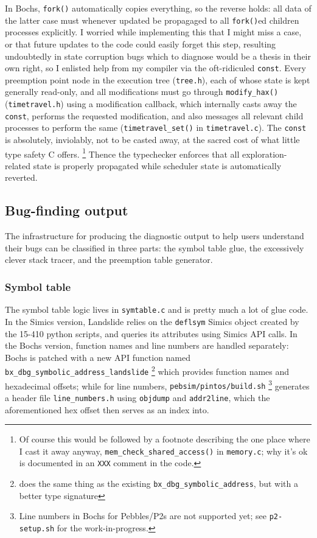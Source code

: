 In Bochs, {\tt fork()} automatically copies everything, so the reverse holds:
all data of the latter case must whenever updated be propagaged to all {\tt fork()}ed children processes explicitly.
I worried while implementing this that I might miss a case, or that future updates to the code could easily forget this step,
resulting undoubtedly in state corruption bugs which to diagnose would be a thesis in their own right,
so I enlisted help from my compiler via the oft-ridiculed {\tt const}.
Every preemption point node in the execution tree ({\tt tree.h}),
each of whose state is kept generally read-only,
and all modifications must go through {\tt modify\_hax()} ({\tt timetravel.h}) using a modification callback,
which internally casts away the {\tt const}, performs the requested modification,
and also messages all relevant child processes to perform the same ({\tt timetravel\_set()} in {\tt timetravel.c}).
The {\tt const} is absolutely, inviolably, not to be casted away, at the sacred cost of what little type safety C offers.%
\footnote{Of course this would be followed by a footnote describing the one place where I cast it away anyway,
{\tt mem\_check\_shared\_access()} in {\tt memory.c};
why it's ok is documented in an {\tt XXX} comment in the code.}
Thence the typechecker enforces that all exploration-related state is properly propagated while scheduler state is automatically reverted.


\subsection{Bug-finding output}

The infrastructure for producing the diagnostic output to help users understand their bugs
can be classified in three parts:
the symbol table glue, the excessively clever stack tracer, and the preemption table generator.

\subsubsection{Symbol table}

The symbol table logic lives in {\tt symtable.c} and is pretty much a lot of glue code.
In the Simics version, Landslide relies on the {\tt deflsym} Simics object created by the 15-410 python scripts,
and queries its attributes using Simics API calls.
In the Bochs version, function names and line numbers are handled separately:
Bochs is patched with a new API function named {\tt bx\_dbg\_symbolic\_address\_landslide}%
\footnote{does the same thing as the existing {\tt bx\_dbg\_symbolic\_address}, but with a better type signature}
which provides function names and hexadecimal offsets;
while for line numbers, {\tt pebsim/pintos/build.sh}%
\footnote{Line numbers in Bochs for Pebbles/P2s are not supported yet; see {\tt p2-setup.sh} for the work-in-progress.}
generates a header file {\tt line\_numbers.h}
using {\tt objdump} and {\tt addr2line},
which the aforementioned hex offset then serves as an index into.

